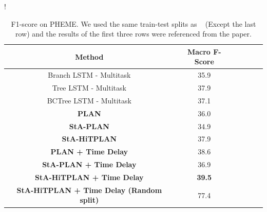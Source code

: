 \documentclass[letterpaper]{article} %
\begin{document}
\begin{table}
\small
\centering
{}!{
\begin{tabular}{cccccc} \toprule
Method & Macro F-Score \\ \midrule
Branch LSTM - Multitask	& 35.9 \\
Tree LSTM - Multitask & 37.9 \\
BCTree LSTM - Multitask & 37.1 \\ \bottomrule
\textbf{PLAN}	& 36.0 \\
\textbf{StA-PLAN} & 34.9 \\
\textbf{StA-HiTPLAN} & 37.9 \\
\textbf{PLAN + Time Delay}	& 38.6 \\
\textbf{StA-PLAN + Time Delay} & 36.9 \\
\textbf{StA-HiTPLAN + Time Delay} & \textbf{39.5} \\
\textbf{StA-HiTPLAN + Time Delay (Random split)} & 77.4 \\
\bottomrule
\end{tabular}
}
\caption{F1-score on PHEME. We used the same train-test splits as ~\cite{kumar19} (Except the last row) and the results of the first three rows were referenced from the paper.}
\label{tab:results_pheme}
\end{table}
\end{document}
